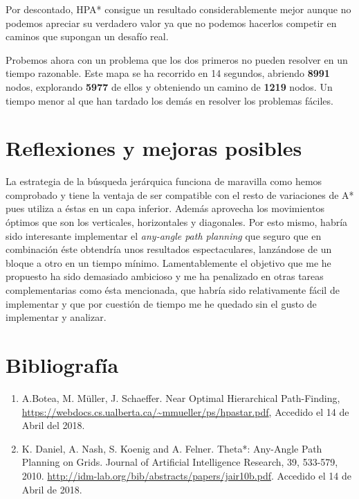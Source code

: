 \documentclass{article}
\newcommand{\img}[1]{
\noindent\makebox[\textwidth][c]{\texttt{[image: \#1]}}%
}
\begin{document}
Por descontado, HPA* consigue un resultado considerablemente mejor aunque no podemos apreciar su verdadero valor ya que no podemos hacerlos competir en caminos que supongan un desafío real.

Probemos ahora con un problema que los dos primeros no pueden resolver en un tiempo razonable. Este mapa se ha recorrido en 14 segundos, abriendo \textbf{8991} nodos, explorando \textbf{5977} de ellos y obteniendo un camino de \textbf{1219} nodos. Un tiempo menor al que han tardado los demás en resolver los problemas fáciles.

\img{HPA-DIF}


\section{Reflexiones y mejoras posibles}

La estrategia de la búsqueda jerárquica funciona de maravilla como hemos comprobado y tiene la ventaja de ser compatible con el resto de variaciones de A* pues utiliza a éstas en un capa inferior. Además aprovecha los movimientos óptimos que son los verticales, horizontales y diagonales. Por esto mismo, habría sido interesante implementar el \emph{any-angle path planning} que seguro que en combinación éste obtendría unos resultados espectaculares, lanzándose de un bloque a otro en un tiempo mínimo. Lamentablemente el objetivo que me he propuesto ha sido demasiado ambicioso y me ha penalizado en otras tareas complementarias como ésta mencionada, que habría sido relativamente fácil de implementar y que por cuestión de tiempo me he quedado sin el gusto de implementar y analizar.

%
\section{Bibliografía}
\begin{enumerate}
\item A.Botea, M. Müller, J. Schaeffer. Near Optimal Hierarchical Path-Finding, \url{https://webdocs.cs.ualberta.ca/~mmueller/ps/hpastar.pdf}, Accedido el 14 de Abril del 2018.
\item K. Daniel, A. Nash, S. Koenig and A. Felner. Theta*: Any-Angle Path Planning on Grids. Journal of Artificial Intelligence Research, 39, 533-579, 2010. \url{http://idm-lab.org/bib/abstracts/papers/jair10b.pdf}. Accedido el 14 de Abril de 2018.
\end{enumerate}
\end{document}
